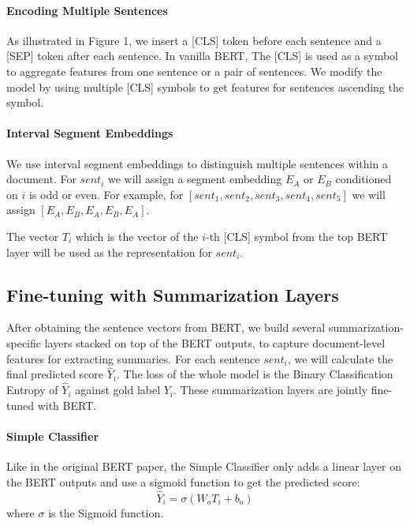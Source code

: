     \paragraph{Encoding Multiple Sentences} As illustrated in Figure 1, we insert a [CLS] token before each sentence and a [SEP] token after each sentence.
    In vanilla BERT, The      [CLS] is used as a symbol to aggregate features from one sentence or a pair of sentences. We modify the model by using multiple [CLS] symbols to get features for  sentences ascending the symbol.
    
    \paragraph{Interval Segment Embeddings}
    We use interval segment embeddings to distinguish multiple sentences within a document. For $sent_i$ we will assign a segment embedding $E_A$ or $E_B$ conditioned on $i$ is odd or even. For example, for  $[sent_1, sent_2, sent_3, sent_4, sent_5]$ we will assign $[E_A, E_B, E_A,E_B, E_A]$.
    
    The vector $T_i$ which is the vector of the $i$-th [CLS] symbol from the top BERT layer will be used as the representation for $sent_i$.
    
    
    \subsection{Fine-tuning with Summarization Layers}
    After obtaining the sentence vectors from BERT, we build several summarization-specific layers stacked on top of the BERT outputs, to capture document-level features for extracting summaries. 
    For each sentence $sent_i$, we will calculate the final predicted score $\hat{Y}_i$.
        The loss of the whole model is the Binary Classification Entropy of $\hat{Y}_i$ against gold label $Y_i$.
    These summarization layers  are jointly fine-tuned with BERT.

    
    \paragraph{Simple Classifier}
    Like in the original BERT paper, the Simple Classifier only adds a linear layer on the BERT outputs and use a sigmoid function to get the predicted score:
    \begin{equation}
    \hat{Y}_i = \sigma(W_oT_i+b_o)
    \end{equation}
    where $\sigma$ is the Sigmoid function.
    

